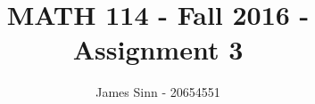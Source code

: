 \documentclass[12pt]{article}
\newenvironment{problem}[2][Problem]{\begin{trivlist}
\item[\hskip \labelsep {\bfseries #1}\hskip \labelsep {\bfseries #2.}]}{\end{trivlist}}
\begin{document}
 
 
\title{MATH 114 - Fall 2016 - Assignment 3}
\author{James Sinn - 20654551}
\maketitle
 

\begin{problem}{1}

\end{problem}


\begin{problem}{2}

\end{problem}

\begin{problem}{3}
\end{problem}

\begin{problem}{4}

\end{problem}
\end{document}
